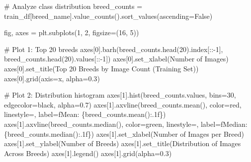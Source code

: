 \documentclass[
  letterpaper,
  DIV=11,
  numbers=noendperiod]{scrartcl}
\newenvironment{Shaded}{\begin{snugshade}}{\end{snugshade}}
\newcommand{\CommentTok}[1]{\textcolor[rgb]{0.37,0.37,0.37}{#1}}
\newcommand{\DecValTok}[1]{\textcolor[rgb]{0.68,0.00,0.00}{#1}}
\newcommand{\FloatTok}[1]{\textcolor[rgb]{0.68,0.00,0.00}{#1}}
\newcommand{\NormalTok}[1]{\textcolor[rgb]{0.00,0.23,0.31}{#1}}
\newcommand{\OperatorTok}[1]{\textcolor[rgb]{0.37,0.37,0.37}{#1}}
\newcommand{\SpecialCharTok}[1]{\textcolor[rgb]{0.37,0.37,0.37}{#1}}
\newcommand{\SpecialStringTok}[1]{\textcolor[rgb]{0.13,0.47,0.30}{#1}}
\newcommand{\StringTok}[1]{\textcolor[rgb]{0.13,0.47,0.30}{#1}}
\newcommand{\VariableTok}[1]{\textcolor[rgb]{0.07,0.07,0.07}{#1}}
\renewenvironment{Shaded}{%
  \begin{tcolorbox}[%
    enhanced,%
    colback=codebg,%
    colframe=codebg,%
    borderline west={3pt}{0pt}{sectionblue},%
    boxrule=0pt,%
    arc=0pt,%
    boxsep=5pt,%
    left=2mm,%
    right=2mm,%
    top=2mm,%
    bottom=2mm%
  ]%
}{%
  \end{tcolorbox}%
}
\begin{document}
\begin{Shaded}
\begin{Highlighting}[]
\CommentTok{\# Analyze class distribution}
\NormalTok{breed\_counts }\OperatorTok{=}\NormalTok{ train\_df[}\StringTok{\textquotesingle{}breed\_name\textquotesingle{}}\NormalTok{].value\_counts().sort\_values(ascending}\OperatorTok{=}\VariableTok{False}\NormalTok{)}

\NormalTok{fig, axes }\OperatorTok{=}\NormalTok{ plt.subplots(}\DecValTok{1}\NormalTok{, }\DecValTok{2}\NormalTok{, figsize}\OperatorTok{=}\NormalTok{(}\DecValTok{16}\NormalTok{, }\DecValTok{5}\NormalTok{))}

\CommentTok{\# Plot 1: Top 20 breeds}
\NormalTok{axes[}\DecValTok{0}\NormalTok{].barh(breed\_counts.head(}\DecValTok{20}\NormalTok{).index[::}\OperatorTok{{-}}\DecValTok{1}\NormalTok{], breed\_counts.head(}\DecValTok{20}\NormalTok{).values[::}\OperatorTok{{-}}\DecValTok{1}\NormalTok{])}
\NormalTok{axes[}\DecValTok{0}\NormalTok{].set\_xlabel(}\StringTok{\textquotesingle{}Number of Images\textquotesingle{}}\NormalTok{)}
\NormalTok{axes[}\DecValTok{0}\NormalTok{].set\_title(}\StringTok{\textquotesingle{}Top 20 Breeds by Image Count (Training Set)\textquotesingle{}}\NormalTok{)}
\NormalTok{axes[}\DecValTok{0}\NormalTok{].grid(axis}\OperatorTok{=}\StringTok{\textquotesingle{}x\textquotesingle{}}\NormalTok{, alpha}\OperatorTok{=}\FloatTok{0.3}\NormalTok{)}

\CommentTok{\# Plot 2: Distribution histogram}
\NormalTok{axes[}\DecValTok{1}\NormalTok{].hist(breed\_counts.values, bins}\OperatorTok{=}\DecValTok{30}\NormalTok{, edgecolor}\OperatorTok{=}\StringTok{\textquotesingle{}black\textquotesingle{}}\NormalTok{, alpha}\OperatorTok{=}\FloatTok{0.7}\NormalTok{)}
\NormalTok{axes[}\DecValTok{1}\NormalTok{].axvline(breed\_counts.mean(), color}\OperatorTok{=}\StringTok{\textquotesingle{}red\textquotesingle{}}\NormalTok{, linestyle}\OperatorTok{=}\StringTok{\textquotesingle{}{-}{-}\textquotesingle{}}\NormalTok{, label}\OperatorTok{=}\SpecialStringTok{f\textquotesingle{}Mean: }\SpecialCharTok{\{}\NormalTok{breed\_counts}\SpecialCharTok{.}\NormalTok{mean()}\SpecialCharTok{:.1f\}}\SpecialStringTok{\textquotesingle{}}\NormalTok{)}
\NormalTok{axes[}\DecValTok{1}\NormalTok{].axvline(breed\_counts.median(), color}\OperatorTok{=}\StringTok{\textquotesingle{}green\textquotesingle{}}\NormalTok{, linestyle}\OperatorTok{=}\StringTok{\textquotesingle{}{-}{-}\textquotesingle{}}\NormalTok{, label}\OperatorTok{=}\SpecialStringTok{f\textquotesingle{}Median: }\SpecialCharTok{\{}\NormalTok{breed\_counts}\SpecialCharTok{.}\NormalTok{median()}\SpecialCharTok{:.1f\}}\SpecialStringTok{\textquotesingle{}}\NormalTok{)}
\NormalTok{axes[}\DecValTok{1}\NormalTok{].set\_xlabel(}\StringTok{\textquotesingle{}Number of Images per Breed\textquotesingle{}}\NormalTok{)}
\NormalTok{axes[}\DecValTok{1}\NormalTok{].set\_ylabel(}\StringTok{\textquotesingle{}Number of Breeds\textquotesingle{}}\NormalTok{)}
\NormalTok{axes[}\DecValTok{1}\NormalTok{].set\_title(}\StringTok{\textquotesingle{}Distribution of Images Across Breeds\textquotesingle{}}\NormalTok{)}
\NormalTok{axes[}\DecValTok{1}\NormalTok{].legend()}
\NormalTok{axes[}\DecValTok{1}\NormalTok{].grid(alpha}\OperatorTok{=}\FloatTok{0.3}\NormalTok{)}


\end{Highlighting}
\end{Shaded}
\end{document}
